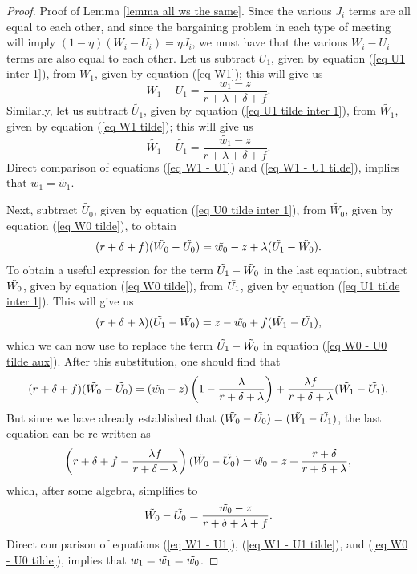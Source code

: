 \documentclass[12pt]{article} %
\theoremstyle{definition}
\begin{document}
\begin{appendix}
\begin{proof}{Proof of Lemma \ref{lemma all ws the same}.}
Since the various $J_i$ terms are all equal to each other, and since the bargaining problem in each type of meeting will imply $(1-\eta)(W_i-U_i)=\eta J_i$, we must have that the various $W_i-U_i$ terms are also equal to each other. Let us subtract $U_1$, given by equation (\ref{eq U1 inter 1}), from $W_1$, given by equation (\ref{eq W1}); this will give us 
\begin{equation}
W_1-U_1=\frac{w_1-z}{r+\lambda+\delta+f}. \label{eq W1 - U1}
\end{equation}Similarly, let us subtract $\tilde{U_1}$, given by equation (\ref{eq U1 tilde inter 1}), from $\tilde{W_1}$, given by equation (\ref{eq W1 tilde}); this will give us 
\begin{equation}
\tilde{W_1}-\tilde{U_1}=\frac{\tilde{w_1}-z}{r+\lambda+\delta+f}. \label{eq W1 - U1 tilde} 
\end{equation}Direct comparison of equations (\ref{eq W1 - U1}) and (\ref{eq W1 - U1 tilde}), implies that $w_1=\tilde{w_1}$. 

Next, subtract $\tilde{U_0}$, given by equation (\ref{eq U0 tilde inter 1}), from $\tilde{W_0}$, given by equation (\ref{eq W0 tilde}), to obtain 
\begin{equation}
 (r+\delta+f)(\Tilde{W_0}-\Tilde{U_0})=\Tilde{w_0}-z+\lambda(\Tilde{U_1}-\Tilde{W_0}). \label{eq W0 - U0 tilde aux}
\end{equation}To obtain a useful expression for the term $\Tilde{U_1}-\Tilde{W_0}$ in the last equation, subtract $\Tilde{W_0}$, given by equation (\ref{eq W0 tilde}), from $\Tilde{U_1}$, given by equation (\ref{eq U1 tilde inter 1}). This will give us   
\begin{equation}
(r+\delta+\lambda)(\Tilde{U_1}-\Tilde{W_0})=z-\Tilde{w_0}+f(\Tilde{W_1}-\Tilde{U_1}), \nonumber 
\end{equation}which we can now use to replace the term $\Tilde{U_1}-\Tilde{W_0}$ in equation (\ref{eq W0 - U0 tilde aux}). After this substitution, one should find that 
\begin{equation*}
(r+\delta+f)(\Tilde{W_0}-\Tilde{U_0})=(\Tilde{w_0}-z)\left(1-\frac{\lambda}{r+\delta+\lambda}\right) + \frac{\lambda f}{r+\delta+\lambda}(\Tilde{W_1}-\Tilde{U_1}).
\end{equation*}But since we have already established that $(\Tilde{W_0}-\Tilde{U_0})=(\Tilde{W_1}-\Tilde{U_1})$, the last equation can be re-written as 
\begin{equation*}
   \left(r+\delta+f-\frac{\lambda f}{r+\delta+\lambda}\right)(\Tilde{W_0}-\Tilde{U_0})=\Tilde{w_0}-z+\frac{r+\delta}{r+\delta+\lambda},  
\end{equation*}which, after some algebra, simplifies to  
\begin{equation}
      \Tilde{W_0}-\Tilde{U_0} = \frac{\Tilde{w_0}-z}{r+\delta+\lambda+f}.\label{eq W0 - U0 tilde}  
\end{equation}Direct comparison of equations (\ref{eq W1 - U1}), (\ref{eq W1 - U1 tilde}), and (\ref{eq W0 - U0 tilde}), implies that $w_1=\tilde{w_1}=\Tilde{w_0}$.


\end{proof}
\end{appendix}
\end{document}
